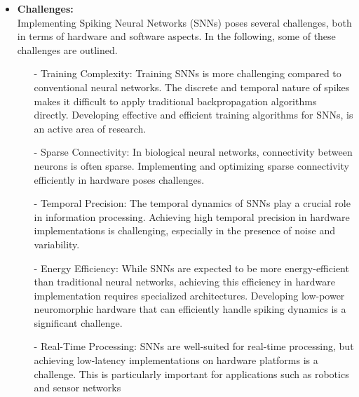 \begin {itemize}
Neuromorphic systems  include a large number of spiking neurons, synapses and their interconnecting structure on hardware.  Such systems are highly parallel, fast, fault tolerant,  intelligent and compact. Further, Neuromorphic systems often operate in an event-driven manner, processing information only when there is a change or event in the input, rather than continuously processing static data. This event-driven approach can lead to increased energy efficiency.  This research focus is on neuromorphic systems implementing Spiking Neural Networks (SNNs). 
 \item [$\bullet$] { \bf Challenges:} \vspace{0.5em} \\
Implementing Spiking Neural Networks (SNNs) poses several challenges, both in terms of hardware and software aspects. In the following, some of these challenges are outlined. 
\begin{itemize}
\item[-] Training Complexity: Training SNNs is more challenging compared to conventional neural networks. The discrete and temporal nature of spikes makes it difficult to apply traditional backpropagation algorithms directly. Developing effective and efficient training algorithms for SNNs, 
is an active area of research.
\item [-] Sparse Connectivity: In biological neural networks, connectivity between neurons is often sparse. Implementing and optimizing sparse connectivity efficiently in hardware poses challenges.
\item[-] Temporal Precision: The temporal dynamics of SNNs play a crucial role in information processing. Achieving high temporal precision in hardware implementations is challenging, especially in the presence of noise and variability.
\item[-] Energy Efficiency: While SNNs are expected to be more energy-efficient than traditional neural networks, achieving this efficiency in hardware implementation requires specialized architectures. Developing low-power neuromorphic hardware that can efficiently handle spiking dynamics is a significant challenge.
\item[-] Real-Time Processing: SNNs are well-suited for real-time processing, but achieving low-latency implementations on hardware platforms is a challenge. This is particularly important for applications such as robotics and sensor networks
\end{itemize}


\end{itemize}
